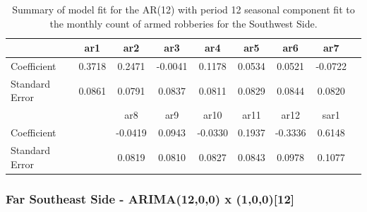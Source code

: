 \documentclass{article} %
\begin{document}
 
  \begin{table}[h]
	\label{tab:data}
	\begin{center}
	\begin{tabular}{lcccccccc}
			\hline
      &   ar1  &   ar2    &  ar3  &   ar4 &    ar5   &  ar6  &    ar7    \\\hline
 Coefficient &      0.3718 & 0.2471 & -0.0041  & 0.1178 &  0.0534 &  0.0521 & -0.0722 \\
 Standard Error & 0.0861 & 0.0791&   0.0837 & 0.0811 & 0.0829&  0.0844  & 0.0820 \\\hline
& & ar8 &  ar9  &   ar10  &  ar11  &   ar12   & sar1 \\\hline
Coefficient &  & -0.0419 & 0.0943  & -0.0330  &0.1937 & -0.3336  & 0.6148\\
Standard Error &  & 0.0819 & 0.0810  & 0.0827&  0.0843 &  0.0978  &0.1077\\
		\end{tabular}
	\caption{Summary of model fit for the AR(12) with period 12 seasonal component fit to the monthly count of armed robberies for the Southwest Side.}
	\end{center}
\end{table}



 \break
 \newpage
 
 
 
\subsubsection{Far Southeast Side - ARIMA(12,0,0) x (1,0,0)[12]}
 
\end{document}
